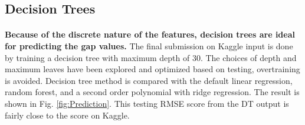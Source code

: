 \documentclass[11pt]{article}
\begin{document}
\subsection{Decision Trees}
\paragraph{}
\textbf{Because of the discrete nature of the features, decision trees are ideal for predicting the gap values.} The final submission on Kaggle input is done by training a decision tree with maximum depth of 30. The choices of depth and maximum leaves have been explored and optimized based on testing, overtraining is avoided. Decision tree method is compared with the default linear regression, random forest, and a second order polynomial with ridge regression. The result is shown in Fig. \ref{fig:Prediction}. This testing RMSE score from the DT output is fairly close to the score on Kaggle.
\end{document}
